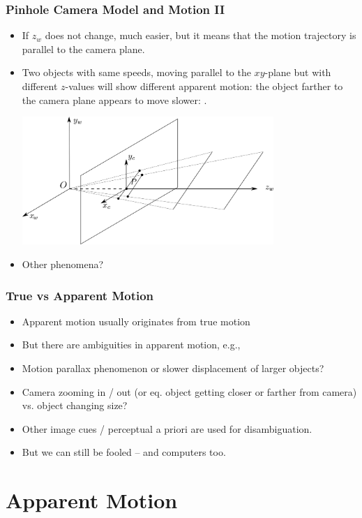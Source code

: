 \documentclass[10pt]{beamer}
\newcommand{\myemph}[1]{{\color{blue}{#1}}}
\begin{document}
\begin{frame}
  \frametitle{Pinhole Camera Model and Motion II}
  \begin{itemize}
  \item If $z_w$ does not change, much easier, but it means that the motion trajectory is
    parallel to the camera plane.
  \item Two objects with same speeds, moving parallel to the $xy$-plane but with
    different $z$-values will show different apparent motion: the object farther to the
    camera plane appears to move slower: \myemph{motion parallax}.
    \begin{center}
      \includegraphics[width=0.75\textwidth]{FIGURES/pinholepara}
    \end{center}
  \item Other phenomena?
  \end{itemize}
\end{frame}

\begin{frame}
  \frametitle{True vs Apparent Motion}
  \begin{itemize}
  \item Apparent motion usually originates from true motion
  \item But there are ambiguities in apparent motion, e.g.,
  \item Motion parallax phenomenon or slower displacement of larger objects?
  \item Camera zooming in / out (or eq. object getting closer or
    farther from camera) vs. object changing size?
  \item Other image cues / perceptual a priori are used for disambiguation.
  \item But we can still be fooled -- and computers too.
  \end{itemize}
\end{frame}


\section{Apparent Motion}
\label{sec:appmot}
\end{document}
